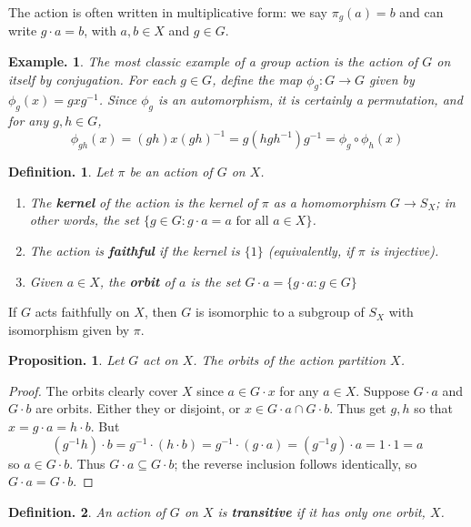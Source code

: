 \documentclass[11pt, a4paper]{memoir}
\newcommand{\mbf}[1]{{\boldmath\bfseries #1}}
\theoremstyle{change}
\newtheorem{proposition}[theorem]{Proposition.}
\theoremstyle{plain}
\theoremstyle{nonumberplain}
\newtheorem{definition}{Definition.}
\newtheorem{example}{Example.}
\newtheorem{proof}{Proof}
\numberwithin{equation}{section}
\begin{document}
The action is often written in multiplicative form: we say $\pi_g(a)=b$ and can write $g\cdot a=b$, with $a,b\in X$ and $g\in G$.
\begin{example}
    The most classic example of a group action is the action of $G$ on itself by conjugation.
    For each $g\in G$, define the map $\phi_g:G\to G$ given by $\phi_g(x)=gxg^{-1}$.
    Since $\phi_g$ is an automorphism, it is certainly a permutation, and for any $g,h\in G$,
    \begin{equation*}
        \phi_{gh}(x)=(gh)x(gh)^{-1}=g(hgh^{-1})g^{-1}=\phi_g\circ\phi_h(x)
    \end{equation*}
\end{example}
\begin{definition}
    Let $\pi$ be an action of $G$ on $X$.
    \begin{enumerate}[nolistsep]
        \item The \mbf{kernel} of the action is the kernel of $\pi$ as a homomorphism $G\to S_X$; in other words, the set $\{g\in G:g\cdot a=a\text{ for all }a\in X\}$.
        \item The action is \mbf{faithful} if the kernel is $\{1\}$ (equivalently, if $\pi$ is injective).
        \item Given $a\in X$, the \mbf{orbit} of $a$ is the set $G\cdot a=\{g\cdot a:g\in G\}$
    \end{enumerate}
\end{definition}
If $G$ acts faithfully on $X$, then $G$ is isomorphic to a subgroup of $S_X$ with isomorphism given by $\pi$.
\begin{proposition}
    Let $G$ act on $X$.
    The orbits of the action partition $X$.
\end{proposition}
\begin{proof}
    The orbits clearly cover $X$ since $a\in G\cdot x$ for any $a\in X$.
    Suppose $G\cdot a$ and $G\cdot b$ are orbits.
    Either they or disjoint, or $x\in G\cdot a\cap G\cdot b$.
    Thus get $g,h$ so that $x=g\cdot a=h\cdot b$.
    But
    \begin{equation*}
        (g^{-1}h)\cdot b=g^{-1}\cdot(h\cdot b)=g^{-1}\cdot(g\cdot a)=(g^{-1}g)\cdot a=1\cdot 1=a
    \end{equation*}
    so $a\in G\cdot b$.
    Thus $G\cdot a\subseteq G\cdot b$; the reverse inclusion follows identically, so $G\cdot a=G\cdot b$.
\end{proof}
\begin{definition}
    An action of $G$ on $X$ is \mbf{transitive} if it has only one orbit, $X$.
\end{definition}
\end{document}
